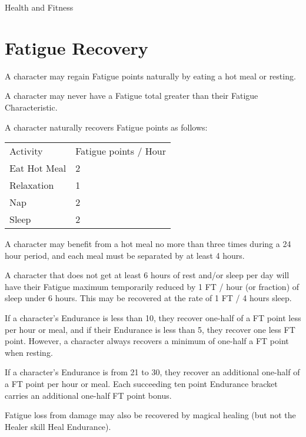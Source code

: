 \begin{Chapter}{Health and Fitness}
\section{Fatigue Recovery}

A character may regain Fatigue points naturally by eating a hot meal
or resting.

A character may never have a Fatigue total greater than their Fatigue
Characteristic.

A character naturally recovers Fatigue points as follows:

\begin{tabularx}{\columnwidth}{lX}
Activity		& Fatigue points / Hour \\
Eat Hot Meal		& 2 \\
Relaxation 		& 1 \\
Nap			& 2 \\
Sleep			& 2 \\
\end{tabularx}

\begin{Enumerate}
  
\item A character may benefit from a hot meal no more than three times
  during a 24 hour period, and each meal must be separated by at least
  4 hours.

\item A character that does not get at least 6 hours of rest and/or
  sleep per day will have their Fatigue maximum temporarily reduced by
  1 FT / hour (or fraction) of sleep under 6 hours.  This may be
  recovered at the rate of 1 FT / 4 hours sleep.

\item If a character’s Endurance is less than 10, they recover
  one-half of a FT point less per hour or meal, and if their Endurance
  is less than 5, they recover one less FT point.  However, a
  character always recovers a minimum of one-half a FT point when
  resting.

\item If a character’s Endurance is from 21 to 30, they recover an
  additional one-half of a FT point per hour or meal. Each succeeding
  ten point Endurance bracket carries an additional one-half FT point
  bonus.

\item Fatigue loss from damage may also be recovered by magical
  healing (but not the Healer skill Heal Endurance).

\end{Enumerate}



\end{Chapter}

